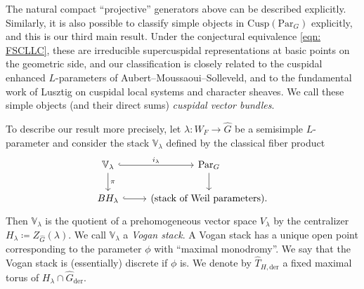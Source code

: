 \documentclass{amsart}
\theoremstyle{definition}
\theoremstyle{remark}
\numberwithin{equation}{section}
\newcommand{\der}{\mathrm{der}}
\newcommand{\wh}{\widehat}
\newcommand{\Par}{\mathrm{Par}}
\newcommand{\Cusp}{\mathrm{Cusp}}
\newcommand{\V}{\mathbb{V}}
\begin{document}
The natural compact ``projective'' generators above can be described explicitly. Similarly, it is also possible to classify simple objects in $\Cusp(\Par_G)$ explicitly, and this is our third main result. Under the conjectural equivalence \eqref{eqn: FSCLLC}, these are irreducible supercuspidal representations at basic points on the geometric side, and our classification is closely related to the cuspidal enhanced $L$-parameters of Aubert--Moussaoui--Solleveld, and to the fundamental work of Lusztig on cuspidal local systems and character sheaves. We call these simple objects (and their direct sums) \emph{cuspidal vector bundles}.

To describe our result more precisely, let $\lambda\colon W_F \rightarrow \wh G$ be a semisimple $L$-parameter and consider the stack $\V_{\lambda}$ defined by the classical fiber product
\begin{equation*}
    \begin{tikzcd}
        \V_{\lambda} \arrow[d, "\pi"] \arrow[r, hook, "i_\lambda"] & \Par_G \arrow[d] \\
       BH_{\lambda} \arrow[r, hook] &  (\text{stack of Weil parameters}).
    \end{tikzcd}
\end{equation*}
Then $\V_{\lambda}$ is the quotient of a prehomogeneous vector space $V_{\lambda}$ by the centralizer $H_{\lambda} \coloneq Z_{\wh{G}}(\lambda)$. We call $\V_{\lambda}$ a \emph{Vogan stack}. A Vogan stack has a unique open point corresponding to the parameter $\phi$ with ``maximal monodromy''. We say that the Vogan stack is (essentially) discrete if $\phi$ is. We denote by $\wh{T}_{H,\der}$ a fixed maximal torus of $H_{\lambda}\cap \wh G_\der$.
\end{document}
